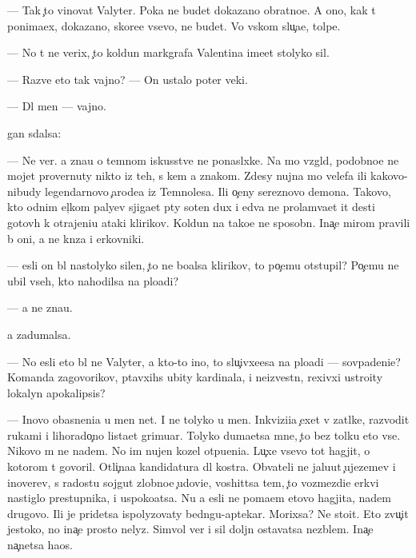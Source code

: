\documentclass[10pt]{book}
\begin{document}
— Tak {\c}to vinovat Valyter. Poka ne budet dokazano obratno{\y}e. A ono, kak t{\yi} ponima{\y}ex, dokazano, skore{\y}e vsevo, ne budet. Vo vs{\ia}kom slu{\c}a{\y}e, tolpe.

— No t{\yi} ne verix, {\c}to koldun markgrafa Valentina ime{\y}et stolyko sil.

— Razve eto tak vajno? — On ustalo poter veki.

— Dl{\ia} men{\ia} — vajno.

{\Q}{\yi}gan sdalsa:

— Ne ver{\iu}. {\Y}a zna{\y}u o temnom iskusstve ne ponasl{\yi}xke. Na mo{\y} vzgl{\ia}d, podobno{\y}e ne mojet provernuty nikto iz teh, s kem {\y}a znakom. Zdesy nujna mo{\x} velefa ili kakovo-nibudy legendarnovo {\c}arode{\y}a iz Temnoles{\y}a. Ili o{\c}eny ser{\y}eznovo demona. Takovo, kto odnim {\x}el{\c}kom paly{\q}ev sjiga{\y}et p{\ia}ty soten dux i {\y}edva ne prolam{\yi}va{\y}et {\x}it des{\ia}ti gotov{\yi}h k otrajeni{\y}u ataki klirikov. Koldun{\yi} na tako{\y}e ne sposobn{\yi}. Ina{\c}e mirom pravili b{\yi} oni, a ne kn{\ia}z{\y}a i {\q}erkovniki.

— {\Y}esli on b{\yi}l nastolyko silen, {\c}to ne bo{\y}alsa klirikov, to po{\c}emu otstupil? Po{\c}emu ne ubil vseh, kto nahodilsa na plo{\x}adi?

— {\Y}a ne zna{\y}u.

{\Y}a zadumalsa.

— No {\y}esli eto b{\yi}l ne Valyter, a kto-to ino{\y}, to slu{\c}ivxe{\y}esa na plo{\x}adi — sovpadeni{\y}e? Komanda zagovor{\x}ikov, p{\yi}tavxihs{\ia} ubity kardinala, i ne{\y}izvestn{\yi}{\y}, rexivxi{\y} ustro{\y}ity lokalyn{\yi}{\y} apokalipsis?

— Inovo ob{\y}asneni{\y}a u men{\ia} net. I ne tolyko u men{\ia}. Inkvizi{\q}i{\y}a {\c}exet v zat{\yi}lke, razvodit rukami i lihorado{\c}no lista{\y}et grimuar{\yi}. Tolyko duma{\y}etsa mne, {\c}to bez tolku eto vse. Nikovo m{\yi} ne na{\y}dem. No im nujen kozel otpu{\x}eni{\y}a. Lu{\c}xe vsevo tot hagjit, o kotorom t{\yi} govoril. Otli{\c}na{\y}a kandidatura dl{\ia} kostra. Ob{\yi}vateli ne jalu{\y}ut {\c}ujezem{\q}ev i inover{\q}ev, s radost{\y}u sojgut zlobno{\y}e {\c}udovi{\x}e, voshit{\ia}tsa tem, {\c}to vozmezdi{\y}e {\Q}erkvi nastiglo prestupnika, i uspoko{\y}atsa. Nu a {\y}esli ne po{\y}ma{\y}em etovo hagjita, na{\y}dem drugovo. Ili je pridetsa ispolyzovaty bedn{\ia}gu-aptekar{\ia}. Mor{\x}ixsa? Ne sto{\y}it. Eto zvu{\c}it jestoko, no ina{\c}e prosto nelyz{\ia}. Simvol{\yi} ver{\yi} i sil{\yi} doljn{\yi} ostavatsa nez{\yi}blem{\yi}. Ina{\c}e na{\c}netsa haos.
\end{document}
